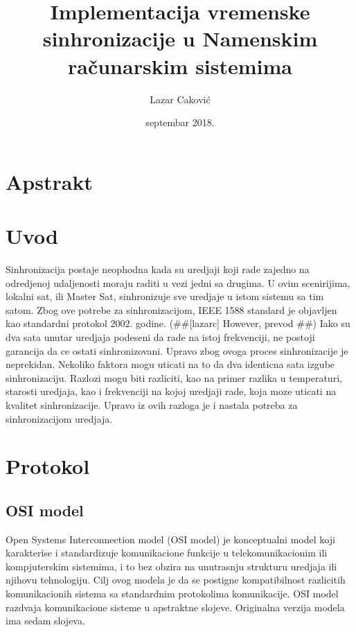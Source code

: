 \documentclass[a4paper,12pt, master]{etf}
\title{Implementacija vremenske sinhronizacije u Namenskim ra\v{c}unarskim sistemima}
\author{Lazar Caković}
\date{septembar 2018.}
\begin{document}
	\maketitle

	\tableofcontents

	\listoffigures

	\newpage

	\chapter{Apstrakt}

	\newpage

	\chapter{Uvod}

    Sinhronizacija postaje neophodna kada su uredjaji koji rade zajedno na odredjenoj 
	udaljenosti moraju raditi u vezi jedni sa drugima. U ovim scenirijima, lokalni sat, ili 
	Master Sat, sinhronizuje sve uredjaje u istom sistemu sa tim satom. Zbog ove potrebe za 
	sinhronizacijom, IEEE 1588 standard je objavljen kao standardni protokol 2002. godine.
	(\#\#[lazarc] However, prevod \#\#) Iako su dva sata unutar uredjaja podeseni da rade na 
	istoj frekvenciji, ne postoji garancija da ce ostati sinhronizovani. Upravo zbog ovoga 
	proces sinhronizacije je neprekidan. Nekoliko faktora mogu uticati na to da dva identicna 
	sata izgube sinhronizaciju. Razlozi mogu biti razliciti, kao na primer razlika u 
	temperaturi, starosti uredjaja, kao i frekvenciji na kojoj uredjaji rade, koja moze 
	uticati na kvalitet sinhronizacije. Upravo iz ovih razloga je i nastala potreba za 
	sinhronizacijom uredjaja.
	
	\newpage

	\chapter{Protokol}

	\section{OSI model}

	Open Systems Interconnection model (OSI model) je konceptualni model koji karakterise i
	standardizuje komunikacione funkcije u telekomunikacionim ili kompjuterskim sistemima, i 
	to bez obzira na unutrasnju strukturu uredjaja ili njihovu tehnologiju. Cilj ovog modela 
	je da se postigne kompatibilnost razlicitih komunikacionih sistema sa standardnim 
	protokolima komunikacije. OSI model razdvaja komunikacione sisteme u apstraktne slojeve. 
	Originalna verzija modela ima sedam slojeva.
\end{document}
